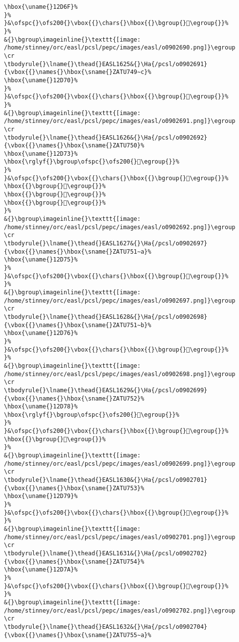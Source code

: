 \begin{verbatim}
\hbox{\uname{}12D6F}%
}%
}&\ofspc{}\ofs200{}\vbox{{}\chars{}\hbox{{}\bgroup{}𒵯\egroup{}}%
}%
&{}\bgroup\imageinline{}\texttt{[image: /home/stinney/orc/easl/pcsl/pepc/images/easl/o0902690.png]}\egroup
\cr
\tbodyrule{}\lname{}\thead{}EASL1625&{}\Ha{/pcsl/o0902691}{\vbox{{}\names{}\hbox{\sname{}ZATU749∼c}%
\hbox{\uname{}12D70}%
}%
}&\ofspc{}\ofs200{}\vbox{{}\chars{}\hbox{{}\bgroup{}𒵰\egroup{}}%
}%
&{}\bgroup\imageinline{}\texttt{[image: /home/stinney/orc/easl/pcsl/pepc/images/easl/o0902691.png]}\egroup
\cr
\tbodyrule{}\lname{}\thead{}EASL1626&{}\Ha{/pcsl/o0902692}{\vbox{{}\names{}\hbox{\sname{}ZATU750}%
\hbox{\uname{}12D73}%
\hbox{\rglyf{}\bgroup\ofspc{}\ofs200{}𒵳\egroup{}}%
}%
}&\ofspc{}\ofs200{}\vbox{{}\chars{}\hbox{{}\bgroup{}𒵱\egroup{}}%
\hbox{{}\bgroup{}𒵲\egroup{}}%
\hbox{{}\bgroup{}𒵳\egroup{}}%
\hbox{{}\bgroup{}𒵴\egroup{}}%
}%
&{}\bgroup\imageinline{}\texttt{[image: /home/stinney/orc/easl/pcsl/pepc/images/easl/o0902692.png]}\egroup
\cr
\tbodyrule{}\lname{}\thead{}EASL1627&{}\Ha{/pcsl/o0902697}{\vbox{{}\names{}\hbox{\sname{}ZATU751∼a}%
\hbox{\uname{}12D75}%
}%
}&\ofspc{}\ofs200{}\vbox{{}\chars{}\hbox{{}\bgroup{}𒵵\egroup{}}%
}%
&{}\bgroup\imageinline{}\texttt{[image: /home/stinney/orc/easl/pcsl/pepc/images/easl/o0902697.png]}\egroup
\cr
\tbodyrule{}\lname{}\thead{}EASL1628&{}\Ha{/pcsl/o0902698}{\vbox{{}\names{}\hbox{\sname{}ZATU751∼b}%
\hbox{\uname{}12D76}%
}%
}&\ofspc{}\ofs200{}\vbox{{}\chars{}\hbox{{}\bgroup{}𒵶\egroup{}}%
}%
&{}\bgroup\imageinline{}\texttt{[image: /home/stinney/orc/easl/pcsl/pepc/images/easl/o0902698.png]}\egroup
\cr
\tbodyrule{}\lname{}\thead{}EASL1629&{}\Ha{/pcsl/o0902699}{\vbox{{}\names{}\hbox{\sname{}ZATU752}%
\hbox{\uname{}12D78}%
\hbox{\rglyf{}\bgroup\ofspc{}\ofs200{}𒵸\egroup{}}%
}%
}&\ofspc{}\ofs200{}\vbox{{}\chars{}\hbox{{}\bgroup{}𒵷\egroup{}}%
\hbox{{}\bgroup{}𒵸\egroup{}}%
}%
&{}\bgroup\imageinline{}\texttt{[image: /home/stinney/orc/easl/pcsl/pepc/images/easl/o0902699.png]}\egroup
\cr
\tbodyrule{}\lname{}\thead{}EASL1630&{}\Ha{/pcsl/o0902701}{\vbox{{}\names{}\hbox{\sname{}ZATU753}%
\hbox{\uname{}12D79}%
}%
}&\ofspc{}\ofs200{}\vbox{{}\chars{}\hbox{{}\bgroup{}𒵹\egroup{}}%
}%
&{}\bgroup\imageinline{}\texttt{[image: /home/stinney/orc/easl/pcsl/pepc/images/easl/o0902701.png]}\egroup
\cr
\tbodyrule{}\lname{}\thead{}EASL1631&{}\Ha{/pcsl/o0902702}{\vbox{{}\names{}\hbox{\sname{}ZATU754}%
\hbox{\uname{}12D7A}%
}%
}&\ofspc{}\ofs200{}\vbox{{}\chars{}\hbox{{}\bgroup{}𒵺\egroup{}}%
}%
&{}\bgroup\imageinline{}\texttt{[image: /home/stinney/orc/easl/pcsl/pepc/images/easl/o0902702.png]}\egroup
\cr
\tbodyrule{}\lname{}\thead{}EASL1632&{}\Ha{/pcsl/o0902704}{\vbox{{}\names{}\hbox{\sname{}ZATU755∼a}%

\end{verbatim}

